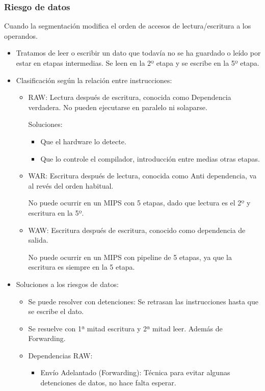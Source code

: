 \documentclass[12pt, twoside, openright]{report} %
\begin{document}
    \subsubsection{Riesgo de datos} Cuando la segmentación modifica el orden de accesos de lectura/escritura a los operandos.
    \begin{itemize}
      \item Tratamos de leer o escribir un dato que todavía no se ha guardado o leído por estar en etapas intermedias. Se leen en la 2º etapa y se escribe en la 5º etapa.
      \item Clasificación según la relación entre instrucciones:
      \begin{itemize}
        \item RAW: Lectura después de escritura, conocida como Dependencia verdadera. No pueden ejecutarse en paralelo ni solaparse.
        
        Soluciones:
        \begin{itemize}
          \item Que el hardware lo detecte.
          
          \item Que lo controle el compilador, introducción entre medias otras etapas.
        \end{itemize}    
          
       
        \item WAR: Escritura después de lectura, conocida como Anti dependencia, va al revés del orden habitual.
        
        No puede ocurrir en un MIPS con 5 etapas, dado que lectura es el 2º y escritura en la 5º.
        \item WAW: Escritura después de escritura, conocido como dependencia de salida.
        
        No puede ocurrir en un MIPS con pipeline de 5 etapas, ya que la escritura es siempre en la 5 etapa.
      \end{itemize}
          
      \item Soluciones a los riesgos de datos:
      \begin{itemize}
        \item Se puede resolver con detenciones: Se retrasan las instrucciones hasta que se escribe el dato.
        \item Se resuelve con 1ª mitad escritura y 2ª mitad leer. Además de Forwarding.
        \item Dependencias RAW:
        \begin{itemize}
          \item Envío Adelantado (Forwarding): Técnica para evitar algunas detenciones de datos, no hace falta esperar.


\end{itemize}
\end{itemize}
\end{itemize}
\end{document}
